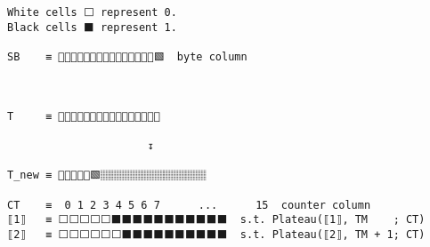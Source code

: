 \documentclass[varwidth=\maxdimen,margin=0.5cm,multi={verbatim}]{standalone}
\begin{document}
\begin{verbatim}
White cells ⬜ represent 0.
Black cells ⬛ represent 1.

SB    ≡ 🏻🏻🏻🏻🏻🏻🏻🏻🏻🏻🏻🏻🏻🏻🏻🟩  byte column



T     ≡ 🏽🏽🏽🏽🏽🏽🏽🏽🏽🏽🏽🏽🏽🏽🏽🏽

                      ↧          

T_new ≡ 🏽🏽🏽🏽🏽🟩🏽🏽🏽🏽🏽🏽🏽🏽🏽🏽

CT    ≡  0 1 2 3 4 5 6 7      ...      15  counter column
⟦1⟧   ≡ ⬜⬜⬜⬜⬜⬛⬛⬛⬛⬛⬛⬛⬛⬛⬛⬛  s.t. Plateau(⟦1⟧, TM    ; CT)
⟦2⟧   ≡ ⬜⬜⬜⬜⬜⬜⬛⬛⬛⬛⬛⬛⬛⬛⬛⬛  s.t. Plateau(⟦2⟧, TM + 1; CT)
\end{verbatim}
\end{document}
